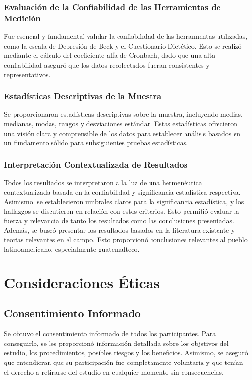 \documentclass[jou]{apa7}
\begin{document}
	\subsubsection{Evaluación de la Confiabilidad de las Herramientas de Medición}
	Fue esencial y fundamental validar la confiabilidad de las herramientas utilizadas, como la escala de Depresión de Beck y el Cuestionario Dietético. Esto se realizó mediante el cálculo del coeficiente alfa de Cronbach, dado que una alta confiabilidad aseguró que los datos recolectados fueran consistentes y representativos.

	\subsubsection{Estadísticas Descriptivas de la Muestra}
	Se proporcionaron estadísticas descriptivas sobre la muestra, incluyendo medias, medianas, modas, rangos y desviaciones estándar. Estas estadísticas ofrecieron una visión clara y comprensible de los datos para establecer análisis basados en un fundamento sólido para subsiguientes pruebas estadísticas.

	\subsubsection{Interpretación Contextualizada de Resultados} Todos los
	resultados se interpretaron a la luz de una hermenéutica contextualizada
	basada en la confiabilidad y significancia estadística respectiva.
	Asimismo, se establecieron umbrales claros para la significancia
	estadística, y los hallazgos se discutieron en relación con estos
	criterios. Esto permitió evaluar la fuerza y relevancia de tanto
	los resultados como las conclusiones presentadas. Además, se buscó
	presentar los resultados basados en la literatura existente y
	teorías relevantes en el campo. Esto proporcionó conclusiones
	relevantes al pueblo latinoamericano, especialmente guatemalteco.

	\section{Consideraciones Éticas}\label{consideraciones-uxe9ticas}

	\subsection{Consentimiento Informado}\label{consentimiento-informado}

	Se obtuvo el consentimiento informado de todos los participantes. Para
	conseguirlo, se les proporcionó información detallada sobre los
	objetivos del estudio, los procedimientos, posibles riesgos y los
	beneficios. Asimismo, se aseguró que entendieran que su participación fue
	completamente voluntaria y que tenían el derecho a retirarse del estudio
	en cualquier momento sin consecuencias.
\end{document}
